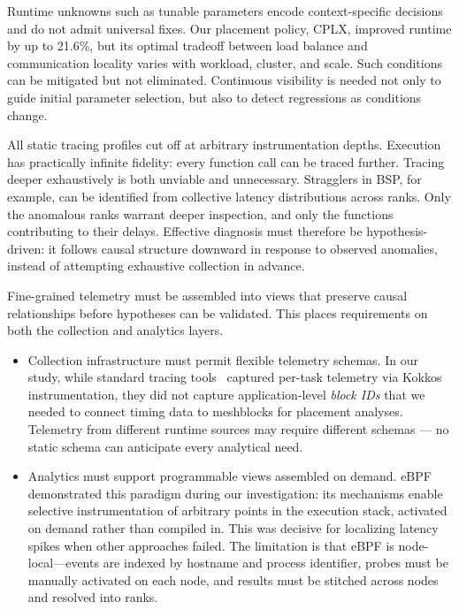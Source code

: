 
\noindent Runtime unknowns such as tunable parameters encode context-specific decisions and do not admit
universal fixes.
Our placement policy, CPLX, improved runtime by up to 21.6\%, but its optimal tradeoff between
load balance and communication locality varies with workload, cluster, and scale.
Such conditions can be mitigated but not eliminated.
Continuous visibility is needed not only to guide initial parameter selection, but also to detect
regressions as conditions change.


\noindent All static tracing profiles cut off at arbitrary instrumentation depths.
Execution has practically infinite fidelity: every function call can be
traced further.
Tracing deeper exhaustively is both unviable and unnecessary.
Stragglers in BSP, for example, can be identified from collective latency distributions across
ranks.
Only the anomalous ranks warrant deeper inspection, and only the functions contributing to their
delays.
Effective diagnosis must therefore be hypothesis-driven: it follows causal structure downward in
response to observed anomalies, instead of attempting exhaustive collection in advance.


\noindent Fine-grained telemetry must be assembled into views that preserve causal relationships
before hypotheses can be validated.
This places requirements on both the collection and analytics layers.

\begin{itemize}[leftmargin=*]
  \item Collection infrastructure must permit flexible telemetry schemas.
        In our study, while standard tracing tools~\cite{Shend2006:TAU} captured per-task telemetry via
        Kokkos~\cite{Hammo2018:KokkosP}
        instrumentation, they did not capture application-level \emph{block IDs} that we needed to
        connect timing data to meshblocks for placement analyses.
        Telemetry from different runtime sources may require different schemas --- no static schema
        can anticipate every analytical need.

  \item Analytics must support programmable views assembled on demand.
        eBPF demonstrated this paradigm during our investigation: its mechanisms enable selective
        instrumentation of arbitrary points in the execution stack, activated on demand rather
        than compiled in.
        This was decisive for localizing latency spikes when other approaches failed.
        The limitation is that eBPF is node-local---events are indexed by hostname and process
        identifier, probes must be manually activated on each node, and results must be stitched
        across nodes and resolved into ranks.
\end{itemize}


